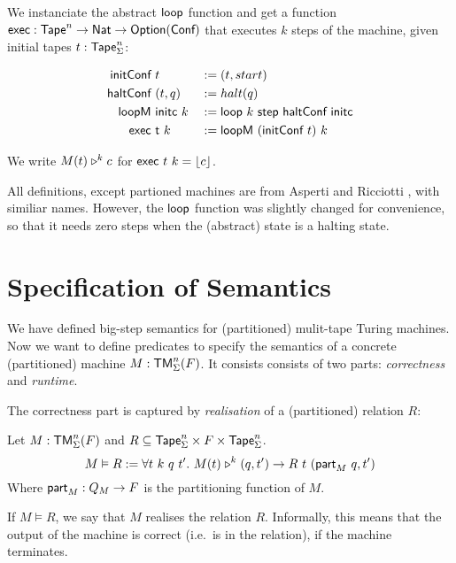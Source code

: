 We instanciate the abstract $\textsf{loop}$ function and get a function $\textsf{exec} : \textsf{Tape}^n \rightarrow \textsf{Nat} \rightarrow \textsf{Option}(\textsf{Conf})$ that executes $k$ steps
of the machine, given initial tapes $t: \textsf{Tape}_\Sigma^n$:

\begin{definition}
  \begin{alignat*}{3}
    \textsf{initConf}   &~t               &&:= (t, start) \\
    \textsf{haltConf}   &~(t, q)          &&:= halt(q) \\
    \textsf{loopM}      &~\textsf{initc}~k    &&:= \textsf{loop}~k~\textsf{step}~\textsf{haltConf}~\textsf{initc} \\
    \textsf{exec}       &~\textsf{t}~k        &&:= \textsf{loopM}~(\textsf{initConf}~t)~k
  \end{alignat*}
\end{definition}

We write $M(t) \mathrel{\triangleright}^k c$ for $\textsf{exec}~t~k = \left\lfloor {c} \right\rfloor$.

All definitions, except partioned machines are from Asperti and Ricciotti \cite{asperti2015}, with similiar names.  However, the $\textsf{loop}$ function
was slightly changed for convenience, so that it needs zero steps when the (abstract) state is a halting state.

\section{Specification of Semantics}
\label{sec:spec_semantics}

We have defined big-step semantics for (partitioned) mulit-tape Turing machines.  Now we want to define predicates to specify the semantics of a
concrete (partitioned) machine $M: \textsf{TM}_\Sigma^n(F)$.  It consists consists of two parts: \emph{correctness} and \emph{runtime}.

The correctness part is captured by \emph{realisation} of a (partitioned) relation $R$:

\begin{definition}[Realisation]
  \label{def:realisation}
  Let $M:\textsf{TM}_\Sigma^n(F)$ and $R \subseteq \textsf{Tape}_\Sigma^n \times F \times \textsf{Tape}_\Sigma^n$.
  \[
    M \vDash R :=
    \forall t~k~q~t'.~M(t) \mathrel{\triangleright}^k (q, t') \rightarrow
    R~t~(\textsf{part}_M~q, t')
  \]
  Where $\textsf{part}_M : Q_M \rightarrow F$ is the partitioning function of $M$.
\end{definition}

If $M \vDash R$, we say that $M$ realises the relation $R$.  Informally, this means that the output of the machine is correct (i.e.\ is in the
relation), if the machine terminates.

